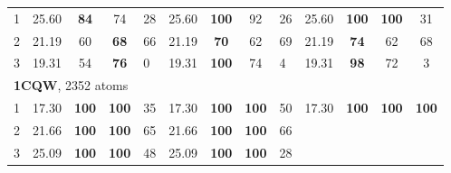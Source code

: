 \begin{tabular}{ccccp{0.5cm}cccp{0.5cm}cccc}
 1 & 25.60    & {\bf 84}  & 74  & 28   &   25.60    & {\bf 100}  & 92  & 26   &   25.60    & {\bf 100}  & {\bf 100}  & 31 \\ 
 2 & 21.19    & 60  & {\bf 68}  & 66   &   21.19    & {\bf 70}  & 62  & 69   &   21.19    & {\bf  74}  & 62  & { 68} \\ 
 3 & 19.31    & 54  & {\bf 76}  & 0   &   19.31    & {\bf 100}  & 74  & 4   &   19.31    & {\bf 98}  & 72  & 3 \\ 
\midrule
\multicolumn{5}{l}{{\bf 1CQW}, 2352 atoms} \\
 1 & 17.30    & {\bf 100}  & {\bf 100}  & 35   &   17.30    & {\bf 100}  & {\bf 100}  & 50   &   17.30    & {\bf 100}  & {\bf 100}  & {\bf 100} \\ 
 2 & 21.66    & {\bf 100}  & {\bf 100}  & 65   &   21.66    & {\bf 100}  & {\bf 100}  & 66   &        & {\bf  }  & {\bf  }  & {\bf  } \\ 
 3 & 25.09    & {\bf 100}  & {\bf 100}  & 48   &   25.09    & {\bf 100}  & {\bf 100}  & 28   &        & {\bf  }  & {\bf  }  & {\bf  } \\ 

\end{tabular}
